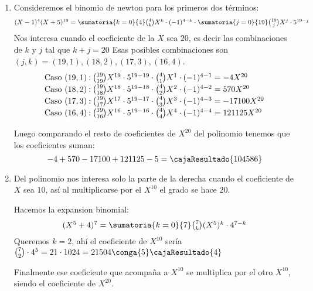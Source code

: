 \begin{enumerate}[label=\roman*)]
  \item Consideremos el binomio de newton para los primeros dos términos:
        $$
          \textstyle
          (X - 1)^4(X + 5)^{19} =
          \sumatoria{k = 0}{4} \binom{4}{k} X^k \cdot (-1)^{4 - k}
          \cdot
          \sumatoria{j=0}{19} \binom{19}{j} X^j \cdot 5^{19 - j}
        $$
        Nos interesa cuando el coeficiente de la $X$ sea $20$, es decir las combinaciones de $k$ y $j$ tal que $k + j = 20$
        Esas posibles combinaciones son $(j,k) = (19,1),(18,2),(17,3),(16,4)$.
        $$
          \arraycolsep=1.1pt\def\arraystretch{1.2}
          \begin{array}{ccl}
            \text{Caso } (19,1) & : & \binom{19}{19}X^{19} \cdot 5^{19-19} \cdot \binom{4}{1}X^1 \cdot (-1)^{4-1} = -4X^{20}     \\
            \text{Caso } (18,2) & : & \binom{19}{18}X^{18} \cdot 5^{19-18} \cdot \binom{4}{2}X^2 \cdot (-1)^{4-2} = 570X^{20}    \\
            \text{Caso } (17,3) & : & \binom{19}{17}X^{17} \cdot 5^{19-17} \cdot \binom{4}{3}X^3 \cdot (-1)^{4-3} = -17100X^{20} \\
            \text{Caso } (16,4) & : & \binom{19}{16}X^{16} \cdot 5^{19-16} \cdot \binom{4}{4}X^4 \cdot (-1)^{4-4} = 121125X^{20}
          \end{array}
        $$

        Luego comparando el resto de coeficientes de $X^{20}$ del polinomio tenemos que los coeficientes suman:
        $$
          -4 + 570 - 17100 + 121125 -5 = \cajaResultado{104586}
        $$

  \item Del polinomio nos interesa solo la parte de la derecha cuando el coeficiente de $X$ sea $10$,
        así al multiplicarse por el $X^{10}$ el grado se hace $20$.

        Hacemos la expansion binomial:
        $$
          \textstyle
          (X^5 + 4)^7 = \sumatoria{k=0}{7} \binom{7}{k} (X^5)^k \cdot 4^{7 - k}
        $$
        Queremos $k = 2$, ahí el coeficiente de $X^{10}$ sería $\binom{7}{2} \cdot 4^5 = 21 \cdot 1024 = 21504 \conga{5} \cajaResultado{4}$

        Finalmente ese coeficiente que acompaña a $X^{10}$ se multiplica por el otro $X^{10}$, siendo el coeficiente de $X^{20}$.

\end{enumerate}

\begin{aportes}
  \item {}
\end{aportes}
